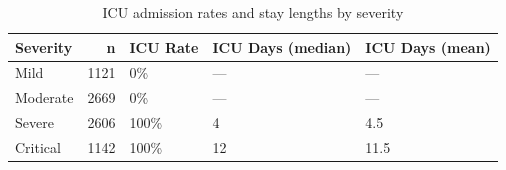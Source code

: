 \begin{table}[htbp]
\caption{ICU admission rates and stay lengths by severity}
\label{tab:icu_severity}
\begin{tabular}{lrlll}
\toprule
Severity & n & ICU Rate & ICU Days (median) & ICU Days (mean) \\
\midrule
Mild & 1121 & 0\% & — & — \\
Moderate & 2669 & 0\% & — & — \\
Severe & 2606 & 100\% & 4 & 4.5 \\
Critical & 1142 & 100\% & 12 & 11.5 \\
\bottomrule
\end{tabular}
\end{table}
